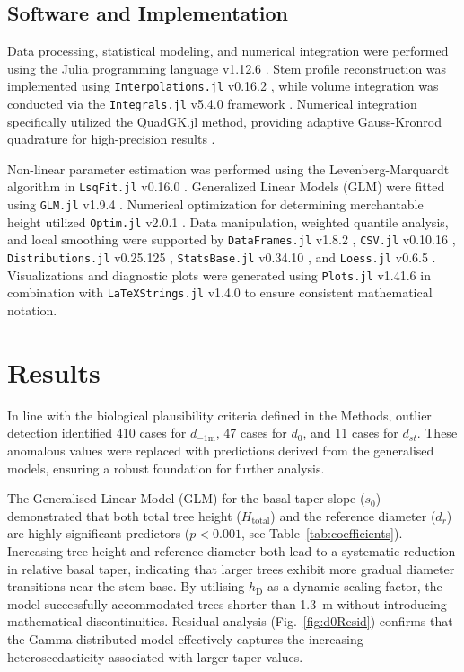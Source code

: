 \documentclass[twocolumn, bibliography=totoc]{scrartcl}
\begin{document}
\subsection{Software and Implementation}

Data processing, statistical modeling, and numerical integration were performed using the \textsf{Julia} programming language v1.12.6 \citep{Julia-2017}. Stem profile reconstruction was implemented using \texttt{Interpolations.jl} v0.16.2 \citep{juliaInterpolations}, while volume integration was conducted via the \texttt{Integrals.jl} v5.4.0 framework \citep{juliaIntegrals}. Numerical integration specifically utilized the \textsf{QuadGK.jl} method, providing adaptive Gauss-Kronrod quadrature for high-precision results \citep{laurie1997calculation}.

Non-linear parameter estimation was performed using the Levenberg-Marquardt algorithm in \texttt{LsqFit.jl} v0.16.0 \citep{juliaLsqFit}. Generalized Linear Models (GLM) were fitted using \texttt{GLM.jl} v1.9.4 \citep{juliaGLM}. Numerical optimization for determining merchantable height utilized \texttt{Optim.jl} v2.0.1 \citep{juliaOptim}. Data manipulation, weighted quantile analysis, and local smoothing were supported by \texttt{DataFrames.jl} v1.8.2 \citep{juliaDataframes}, \texttt{CSV.jl} v0.10.16 \citep{juliaCsv}, \texttt{Distributions.jl} v0.25.125 \citep{juliaDistributions,JSSv098i16}, \texttt{StatsBase.jl} v0.34.10 \citep{juliaStatsBase}, and \texttt{Loess.jl} v0.6.5 \citep{juliaLoess}. Visualizations and diagnostic plots were generated using \texttt{Plots.jl} v1.41.6 \citep{juliaPlots} in combination with \texttt{LaTeXStrings.jl} v1.4.0 \citep{juliaLaTeXStrings} to ensure consistent mathematical notation.


\section{Results}

In line with the biological plausibility criteria defined in the Methods, outlier detection identified 410 cases for $d_{-1\text{m}}$, 47 cases for $d_0$, and 11 cases for $d_{st}$. These anomalous values were replaced with predictions derived from the generalised models, ensuring a robust foundation for further analysis.

The Generalised Linear Model (GLM) for the basal taper slope ($s_0$) demonstrated that both total tree height ($H_{\text{total}}$) and the reference diameter ($d_r$) are highly significant predictors ($p < 0.001$, see Table~\ref{tab:coefficients}). Increasing tree height and reference diameter both lead to a systematic reduction in relative basal taper, indicating that larger trees exhibit more gradual diameter transitions near the stem base. By utilising $h_{\text{D}}$ as a dynamic scaling factor, the model successfully accommodated trees shorter than \qty{1.3}{m} without introducing mathematical discontinuities. Residual analysis (Fig.~\ref{fig:d0Resid}) confirms that the Gamma-distributed model effectively captures the increasing heteroscedasticity associated with larger taper values.
\end{document}
